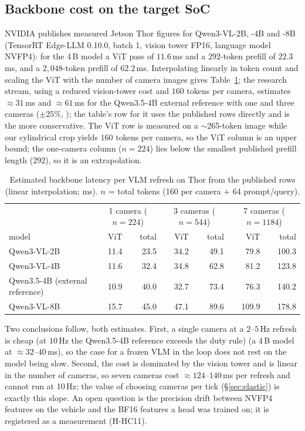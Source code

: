 \subsection{Backbone cost on the target SoC}\label{sec:backbone-cost}
NVIDIA publishes measured Jetson Thor figures for Qwen3-VL-2B, -4B and -8B (TensorRT Edge-LLM 0.10.0, batch 1, vision tower FP16, language model NVFP4)\evP: for the 4\,B model a ViT pass of $11.6$\,ms and a $292$-token prefill of $22.3$\,ms, and a $2{,}048$-token prefill of $62.2$\,ms.
Interpolating linearly in token count and scaling the ViT with the number of camera images gives Table~\ref{tab:thor}; the research stream, using a reduced vision-tower cost and $160$ tokens per camera, estimates $\approx31$\,ms and $\approx61$\,ms for the Qwen3.5-4B external reference with one and three cameras ($\pm25\%$, \evE); the table's row for it uses the published rows directly and is the more conservative. The ViT row is measured on a $\sim$265-token image while our cylindrical crop yields $160$ tokens per camera, so the ViT column is an upper bound; the one-camera column ($n=224$) lies below the smallest published prefill length ($292$), so it is an extrapolation.
\begin{table}[h]
\centering\small
\caption{Estimated backbone latency per VLM refresh on Thor from the published rows (linear interpolation; ms). $n$ = total tokens (160 per camera + 64 prompt/query).}
\label{tab:thor}
\begin{tabular}{@{}lrrrrrr@{}}
\toprule
& \multicolumn{2}{c}{1 camera ($n{=}224$)} & \multicolumn{2}{c}{3 cameras ($n{=}544$)} & \multicolumn{2}{c}{7 cameras ($n{=}1184$)} \\
model & ViT & total & ViT & total & ViT & total \\ \midrule
Qwen3-VL-2B & 11.4 & 23.5 & 34.2 & 49.1 & 79.8 & 100.3 \\
Qwen3-VL-4B & 11.6 & 32.4 & 34.8 & 62.8 & 81.2 & 123.8 \\
Qwen3.5-4B (external reference) & 10.9 & 40.0 & 32.7 & 73.4 & 76.3 & 140.2 \\
Qwen3-VL-8B & 15.7 & 45.0 & 47.1 & 89.6 & 109.9 & 178.8 \\
\bottomrule
\end{tabular}
\end{table}
Two conclusions follow, both estimates. First, a single camera at a $2$--$5$\,Hz refresh is cheap (at $10$\,Hz the Qwen3.5-4B reference exceeds the duty rule) (a 4\,B model at $\approx32$--$40$\,ms), so the case for a frozen VLM in the loop does not rest on the model being slow. Second, the cost is dominated by the vision tower and is linear in the number of cameras,
so seven cameras cost $\approx124$--$140$\,ms per refresh and cannot run at 10\,Hz; the value of choosing cameras per tick (\S\ref{sec:elastic}) is exactly this slope. An open question is the precision drift between NVFP4 features on the vehicle and the BF16 features a head was trained on; it is registered as a measurement (H-HC11).

